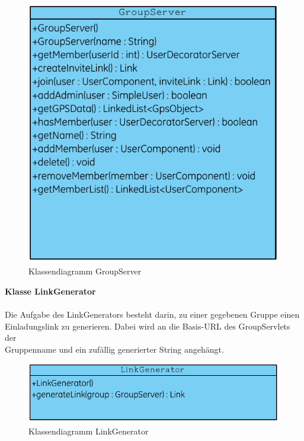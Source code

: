 \begin{figure}[h]
     \centering
     \includegraphics[scale=1.0, trim=2 2 2 2, clip=true]{servergraphs/group-server.pdf}
     \caption{Klassendiagramm GroupServer}
\end{figure}
\clearpage

\textbf{Klasse LinkGenerator}\\
\\
Die Aufgabe des LinkGenerators besteht darin, zu einer gegebenen Gruppe einen \\
Einladungslink zu generieren. Dabei wird an die Basis-URL des GroupServlets der\\
Gruppenname und ein zufällig generierter String angehängt.\\


\begin{figure}[h]
     \centering
     \includegraphics[scale=1.0, trim=2 2 2 2, clip=true]{servergraphs/link-generator.pdf}
     \caption{Klassendiagramm LinkGenerator}
\end{figure}
\clearpage

